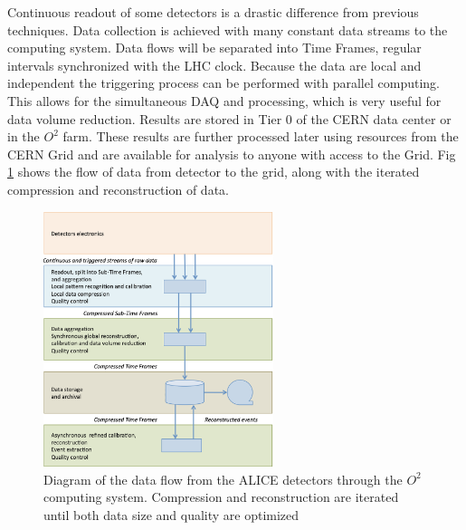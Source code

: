 Continuous readout of some detectors is a drastic difference from previous techniques. Data collection is achieved with many constant data streams to the computing system. Data flows will be separated into Time Frames, regular intervals synchronized with the LHC clock. Because the data are local and independent the triggering process can be performed with parallel computing. This allows for the simultaneous DAQ and processing, which is very useful for data volume reduction. Results are stored in Tier 0 of the CERN data center or in the $O^2$ farm. These results are further processed later using resources from the CERN Grid and are available for analysis to anyone with access to the Grid. Fig \ref{fig:O2_Schematic} shows the flow of data from detector to the grid, along with the iterated compression and reconstruction of data. 


\begin{figure}[H]
    \centering
    \includegraphics[width=0.6\textwidth]{figures/O2/O2_schematic.png}
    \caption{Diagram of the data flow from the ALICE detectors through the $O^2$ computing system. Compression and reconstruction are iterated until both data size and quality are optimized}
    \label{fig:O2_Schematic}
\end{figure}


